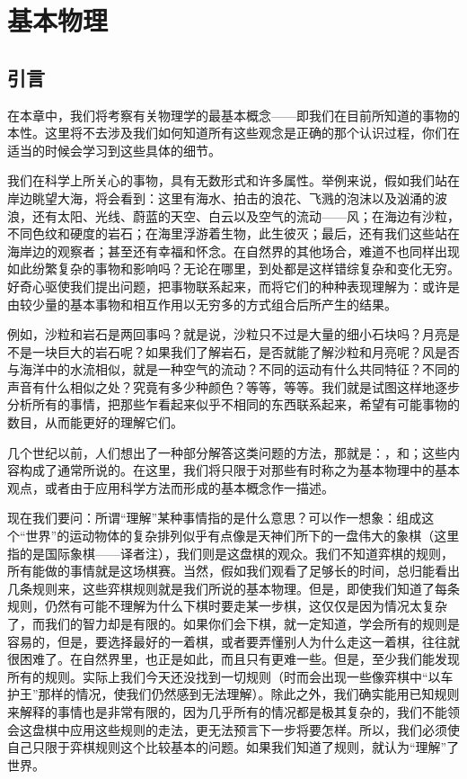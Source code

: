 \chapter{基本物理}

\section{引言}

在本章中，我们将考察有关物理学的最基本概念——即我们在目前所知道的事物的本性。这里将不去涉及我们如何知道所有这些观念是正确的那个认识过程，你们在适当的时候会学习到这些具体的细节。

我们在科学上所关心的事物，具有无数形式和许多属性。举例来说，假如我们站在岸边眺望大海，将会看到：这里有海水、拍击的浪花、飞溅的泡沫以及汹涌的波浪，还有太阳、光线、蔚蓝的天空、白云以及空气的流动——风；在海边有沙粒，不同色纹和硬度的岩石；在海里浮游着生物，此生彼灭；最后，还有我们这些站在海岸边的观察者；甚至还有幸福和怀念。在自然界的其他场合，难道不也同样出现如此纷繁复杂的事物和影响吗？无论在哪里，到处都是这样错综复杂和变化无穷。好奇心驱使我们提出问题，把事物联系起来，而将它们的种种表现理解为：或许是由较少量的基本事物和相互作用以无穷多的方式组合后所产生的结果。

例如，沙粒和岩石是两回事吗？就是说，沙粒只不过是大量的细小石块吗？月亮是不是一块巨大的岩石呢？如果我们了解岩石，是否就能了解沙粒和月亮呢？风是否与海洋中的水流相似，就是一种空气的流动？不同的运动有什么共同特征？不同的声音有什么相似之处？究竟有多少种颜色？等等，等等。我们就是试图这样地逐步分析所有的事情，把那些乍看起来似乎不相同的东西联系起来，希望有可能事物的数目，从而能更好的理解它们。

几个世纪以前，人们想出了一种部分解答这类问题的方法，那就是：，和；这些内容构成了通常所说的。在这里，我们将只限于对那些有时称之为基本物理中的基本观点，或者由于应用科学方法而形成的基本概念作一描述。

现在我们要问：所谓“理解”某种事情指的是什么意思？可以作一想象：组成这个“世界”的运动物体的复杂排列似乎有点像是天神们所下的一盘伟大的象棋（这里指的是国际象棋——译者注），我们则是这盘棋的观众。我们不知道弈棋的规则，所有能做的事情就是这场棋赛。当然，假如我们观看了足够长的时间，总归能看出几条规则来，这些弈棋规则就是我们所说的基本物理。但是，即使我们知道了每条规则，仍然有可能不理解为什么下棋时要走某一步棋，这仅仅是因为情况太复杂了，而我们的智力却是有限的。如果你们会下棋，就一定知道，学会所有的规则是容易的，但是，要选择最好的一着棋，或者要弄懂别人为什么走这一着棋，往往就很困难了。在自然界里，也正是如此，而且只有更难一些。但是，至少我们能发现所有的规则。实际上我们今天还没找到一切规则（时而会出现一些像弈棋中“以车护王”那样的情况，使我们仍然感到无法理解）。除此之外，我们确实能用已知规则来解释的事情也是非常有限的，因为几乎所有的情况都是极其复杂的，我们不能领会这盘棋中应用这些规则的走法，更无法预言下一步将要怎样。所以，我们必须使自己只限于弈棋规则这个比较基本的问题。如果我们知道了规则，就认为“理解”了世界。

